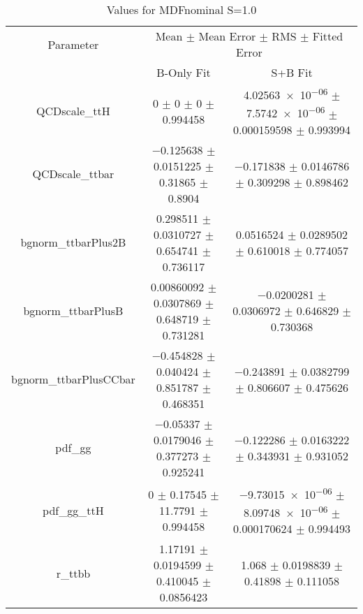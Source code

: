 \begin{table}
\centering
\caption{Values for MDFnominal S=1.0}
\begin{tabular}{ccc}
\toprule
Parameter & \multicolumn{2}{c}{Mean $\pm$ Mean Error $\pm$ RMS $\pm$ Fitted Error}\\
 & B-Only Fit & S+B Fit\\
\midrule
QCDscale\_ttH & \num{0} $\pm$ \num{0} $\pm$ \num{0} $\pm$ \num{0.994458} & \num{4.02563e-06} $\pm$ \num{7.5742e-06} $\pm$ \num{0.000159598} $\pm$ \num{0.993994}\\
QCDscale\_ttbar & \num{-0.125638} $\pm$ \num{0.0151225} $\pm$ \num{0.31865} $\pm$ \num{0.8904} & \num{-0.171838} $\pm$ \num{0.0146786} $\pm$ \num{0.309298} $\pm$ \num{0.898462}\\
bgnorm\_ttbarPlus2B & \num{0.298511} $\pm$ \num{0.0310727} $\pm$ \num{0.654741} $\pm$ \num{0.736117} & \num{0.0516524} $\pm$ \num{0.0289502} $\pm$ \num{0.610018} $\pm$ \num{0.774057}\\
bgnorm\_ttbarPlusB & \num{0.00860092} $\pm$ \num{0.0307869} $\pm$ \num{0.648719} $\pm$ \num{0.731281} & \num{-0.0200281} $\pm$ \num{0.0306972} $\pm$ \num{0.646829} $\pm$ \num{0.730368}\\
bgnorm\_ttbarPlusCCbar & \num{-0.454828} $\pm$ \num{0.040424} $\pm$ \num{0.851787} $\pm$ \num{0.468351} & \num{-0.243891} $\pm$ \num{0.0382799} $\pm$ \num{0.806607} $\pm$ \num{0.475626}\\
pdf\_gg & \num{-0.05337} $\pm$ \num{0.0179046} $\pm$ \num{0.377273} $\pm$ \num{0.925241} & \num{-0.122286} $\pm$ \num{0.0163222} $\pm$ \num{0.343931} $\pm$ \num{0.931052}\\
pdf\_gg\_ttH & \num{0} $\pm$ \num{0.17545} $\pm$ \num{11.7791} $\pm$ \num{0.994458} & \num{-9.73015e-06} $\pm$ \num{8.09748e-06} $\pm$ \num{0.000170624} $\pm$ \num{0.994493}\\
r\_ttbb & \num{1.17191} $\pm$ \num{0.0194599} $\pm$ \num{0.410045} $\pm$ \num{0.0856423} & \num{1.068} $\pm$ \num{0.0198839} $\pm$ \num{0.41898} $\pm$ \num{0.111058}\\
\bottomrule
\end{tabular}
\end{table}